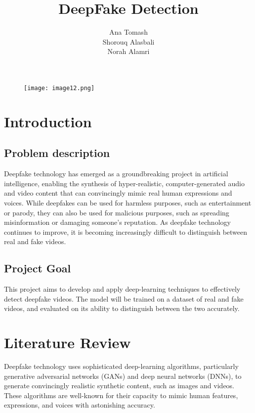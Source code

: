\documentclass{article}
\begin{document}
\begin{figure}
\centering
\texttt{[image: image12.png]}
\end{figure}

\title{DeepFake Detection}
\author{Ana Tomash\\
Shorouq Alasbali\\
Norah Alamri}


\maketitle


\section{Introduction}
\subsection{Problem description}
Deepfake technology has emerged as a groundbreaking project in artificial intelligence, enabling the synthesis of hyper-realistic, computer-generated audio and video content that can convincingly mimic real human expressions and voices. While deepfakes can be used for harmless purposes, such as entertainment or parody, they can also be used for malicious purposes, such as spreading misinformation or damaging someone's reputation. As deepfake technology continues to improve, it is becoming increasingly difficult to distinguish between real and fake videos.


\subsection{Project Goal }
This project aims to develop and apply deep-learning techniques to effectively detect deepfake videos. The model will be trained on a dataset of real and fake videos, and evaluated on its ability to distinguish between the two accurately.



\section{Literature Review }
Deepfake technology uses sophisticated deep-learning algorithms, particularly generative adversarial networks (GANs) and deep neural networks (DNNs), to generate convincingly realistic synthetic content, such as images and videos. These algorithms are well-known for their capacity to mimic human features, expressions, and voices with astonishing accuracy.
\end{document}
